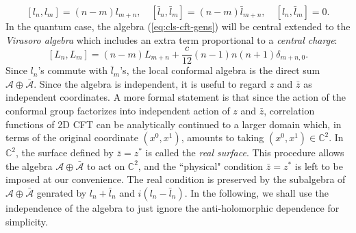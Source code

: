 \documentclass[aps,prb,superscriptaddress,nofootinbib]{revtex4}
\begin{document}
\begin{equation}\label{eq:cls-cft-gens}
	\left[l_n, l_m\right] = (n-m)l_{m+n},\quad
	\left[\bar l_n, \bar l_m\right] = (n-m) \bar l_{m+n},\quad
	\left[l_n, \bar l_m\right] = 0.
\end{equation}
In the quantum case, the algebra (\ref{eq:cls-cft-gens}) will be central extended to the \textit{Virasoro algebra} which includes an extra term proportional to a \textit{central charge}:
\begin{equation}\label{eq:virasoro-algebra}
	\left[L_n, L_m\right] = (n-m) L_{m+n} + \frac{c}{12}(n-1)n(n+1)\delta_{m+n,0}.
\end{equation}
Since $l_n$'s commute with $\bar l_m$'s, the local conformal algebra is the direct sum $\mathcal{A}\oplus\bar{\mathcal{A}}$.
Since the algebra is independent, it is useful to regard $z$ and $\bar z$ as independent coordinates.
A more formal statement is that since the action of the conformal group factorizes into independent action of $z$ and $\bar z$, correlation functions of 2D CFT can be analytically continued to a larger domain which, in terms of the original coordinate $(x^0,x^1)$, amounts to taking $(x^0,x^1)\in \mathbb C^2$.
In $\mathbb C^2$, the surface defined by $\bar z = z^*$ is called the \textit{real surface}.
This procedure allows the algebra $\mathcal{A}\oplus\bar{\mathcal A}$ to act on $\mathbb C^2$, and the ``physical" condition $\bar z = z^*$ is left to be imposed at our convenience.
The real condition is preserved by the subalgebra of $\mathcal{A}\oplus\bar{\mathcal A}$ genrated by $l_n+\bar l_n$ and $i(l_n-\bar l_n)$.
In the following, we shall use the independence of the algebra to just ignore the anti-holomorphic dependence for simplicity.
\end{document}
